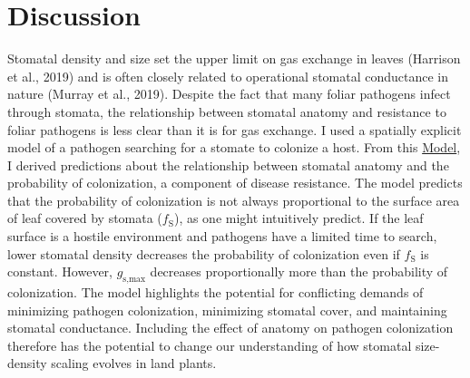 \documentclass[utf8]{frontiersSCNS}
\newcommand{\fs}{$f_\text{S}$}
\newcommand{\gsmax}{$g_\text{s,max}$}
\begin{document}
\hypertarget{discussion}{%
\section*{Discussion}\label{discussion}}

Stomatal density and size set the upper limit on gas exchange in leaves
(Harrison et al., 2019) and is often closely related to operational
stomatal conductance in nature (Murray et al., 2019). Despite the fact
that many foliar pathogens infect through stomata, the relationship
between stomatal anatomy and resistance to foliar pathogens is less
clear than it is for gas exchange. I used a spatially explicit model of
a pathogen searching for a stomate to colonize a host. From this
\protect\hyperlink{model}{Model}, I derived predictions about the
relationship between stomatal anatomy and the probability of
colonization, a component of disease resistance. The model predicts that
the probability of colonization is not always proportional to the
surface area of leaf covered by stomata (\fs), as one might intuitively
predict. If the leaf surface is a hostile environment and pathogens have
a limited time to search, lower stomatal density decreases the
probability of colonization even if \fs{} is constant. However, \gsmax{}
decreases proportionally more than the probability of colonization. The
model highlights the potential for conflicting demands of minimizing
pathogen colonization, minimizing stomatal cover, and maintaining
stomatal conductance. Including the effect of anatomy on pathogen
colonization therefore has the potential to change our understanding of
how stomatal size-density scaling evolves in land plants.
\end{document}
